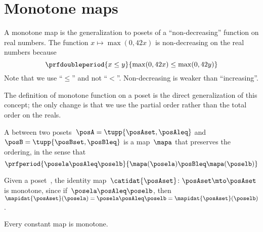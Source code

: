 
\section{Monotone maps}
\label{sec:monotonicity-monotone-maps}


A monotone map is the generalization to posets of a ``non-decreasing'' function on real numbers.
The function $x \mapsto \max(0, 42 x)$ is non-decreasing on the real numbers because
\begin{equation}
    \prfdoubleperiod{
        x \leq y
    }{
        \max(0, 42 x) \leq \max(0, 42 y)
    }
\end{equation}
Note that we use ``$\leq$'' and not ``$<$''.
Non-decreasing is weaker than ``increasing''.

The definition of monotone function on a poset is the direct generalization of this concept; the only change  is that we use the partial order rather than the total order on the reals.

\begin{definition}
    \label{def:monotone}
    A \emph{} between two posets~$\posA=\tupp{\posAset, \posAleq}$ and~$\posB=\tupp{\posBset, \posBleq}$ is a map~$\mapa$ that preserves the ordering, in the sense that
    \begin{equation}
        \prfperiod{
            \posela \posAleq \poselb
        }{
            \mapa(\posela) \posBleq \mapa(\poselb)
        }
    \end{equation}
\end{definition}

\begin{example}
    Given a poset~\posA, the identity map~$\catidat{\posAset}\colon \posAset \mto \posAset$ is monotone, since if~$\posela\posAleq \poselb$, then~$\mapidat{\posAset}(\posela)=\posela \posAleq  \poselb =  \mapidat{\posAset}(\poselb )$.
\end{example}

\begin{example}
    Every constant map is monotone.
\end{example}

